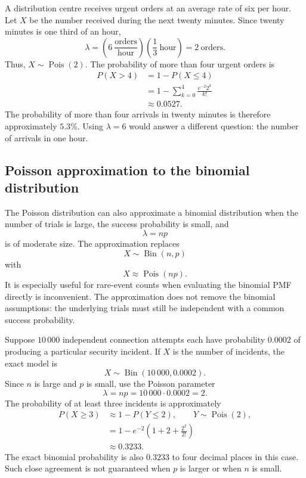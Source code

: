 \begin{example}\par
A distribution centre receives urgent orders at an average rate of six per hour. Let $X$ be the number received during the next twenty minutes. Since twenty minutes is one third of an hour,
\[
\lambda
=\left(6\ \frac{\text{orders}}{\text{hour}}\right)
\left(\frac{1}{3}\ \text{hour}\right)
=2\ \text{orders}.
\]
Thus, $X\sim\operatorname{Pois}(2)$. The probability of more than four urgent orders is
\[
\begin{aligned}
P(X>4)
&=1-P(X\leq4)\\
&=1-\sum_{k=0}^{4}\frac{e^{-2}2^k}{k!}\\
&\approx0.0527.
\end{aligned}
\]
The probability of more than four arrivals in twenty minutes is therefore approximately $5.3\%$. Using $\lambda=6$ would answer a different question: the number of arrivals in one hour.
\end{example}

\subsection{Poisson approximation to the binomial distribution}

The Poisson distribution can also approximate a binomial distribution when the number of trials is large, the success probability is small, and
\[
\lambda=np
\]
is of moderate size. The approximation replaces
\[
X\sim\operatorname{Bin}(n,p)
\]
with
\[
X\approx\operatorname{Pois}(np).
\]
It is especially useful for rare-event counts when evaluating the binomial PMF directly is inconvenient. The approximation does not remove the binomial assumptions: the underlying trials must still be independent with a common success probability.

\begin{example}\par
Suppose $10\,000$ independent connection attempts each have probability $0.0002$ of producing a particular security incident. If $X$ is the number of incidents, the exact model is
\[
X\sim\operatorname{Bin}(10\,000,0.0002).
\]
Since $n$ is large and $p$ is small, use the Poisson parameter
\[
\lambda=np=10\,000\cdot0.0002=2.
\]
The probability of at least three incidents is approximately
\[
\begin{aligned}
P(X\geq3)
&\approx1-P(Y\leq2),
\qquad Y\sim\operatorname{Pois}(2),\\
&=1-e^{-2}\left(1+2+\frac{2^2}{2!}\right)\\
&\approx0.3233.
\end{aligned}
\]
The exact binomial probability is also $0.3233$ to four decimal places in this case. Such close agreement is not guaranteed when $p$ is larger or when $n$ is small.
\end{example}

